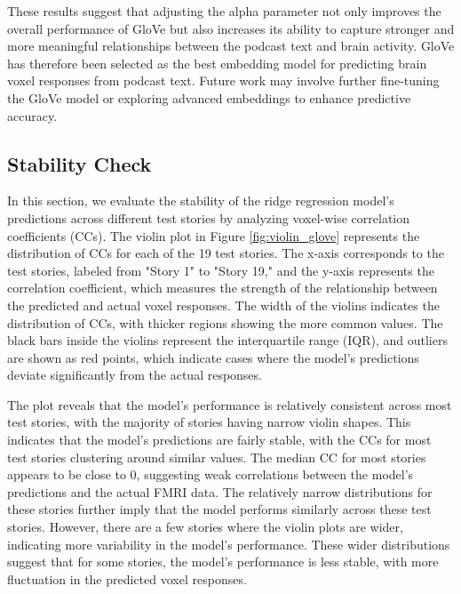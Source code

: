 \documentclass[11pt,letterpaper]{article}
\begin{document}
These results suggest that adjusting the alpha parameter not only improves the overall performance of GloVe but also increases its ability to capture stronger and more meaningful relationships between the podcast text and brain activity. GloVe has therefore been selected as the best embedding model for predicting brain voxel responses from podcast text. Future work may involve further fine-tuning the GloVe model or exploring advanced embeddings to enhance predictive accuracy.


\vspace{1em} %
\subsection{Stability Check}
\vspace{0.5em} %

In this section, we evaluate the stability of the ridge regression model's predictions across different test stories by analyzing voxel-wise correlation coefficients (CCs). The violin plot in Figure \ref{fig:violin_glove} represents the distribution of CCs for each of the 19 test stories. The x-axis corresponds to the test stories, labeled from "Story 1" to "Story 19," and the y-axis represents the correlation coefficient, which measures the strength of the relationship between the predicted and actual voxel responses. The width of the violins indicates the distribution of CCs, with thicker regions showing the more common values. The black bars inside the violins represent the interquartile range (IQR), and outliers are shown as red points, which indicate cases where the model's predictions deviate significantly from the actual responses.

The plot reveals that the model’s performance is relatively consistent across most test stories, with the majority of stories having narrow violin shapes. This indicates that the model’s predictions are fairly stable, with the CCs for most test stories clustering around similar values. The median CC for most stories appears to be close to 0, suggesting weak correlations between the model's predictions and the actual FMRI data. The relatively narrow distributions for these stories further imply that the model performs similarly across these test stories. However, there are a few stories where the violin plots are wider, indicating more variability in the model's performance. These wider distributions suggest that for some stories, the model's performance is less stable, with more fluctuation in the predicted voxel responses.
\end{document}
